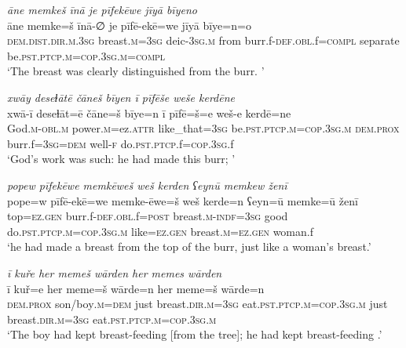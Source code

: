 \ea \label{ZQ.41}
\textit{āne memkeš īnā je pīfekēwe jīyā bīyeno} \\ 
\gll āne memke=š īnā-∅ je pīfē-ekē=we jīyā bīye=n=o \\ 
 \textsc{dem.dist}\textsc{.dir}\textsc{.m}\textsc{.3sg} breast\textsc{.m}\textsc{=3sg} deic\textsc{-3sg}\textsc{.m} from burr.f\textsc{-def}\textsc{.obl}.f\textsc{=compl} separate be\textsc{.pst}\textsc{.ptcp}\textsc{.m}\textsc{=cop}\textsc{.3sg}\textsc{.m}\textsc{=compl} \\ 
\glt `The breast was clearly distinguished from the burr. '
\z 
 
\ea \label{ZQ.42}
\textit{xwāy deseɫātē čāneš bīyen ī pīfēše weše kerdēne} \\ 
\gll xwā-ī deseɫāt=ē čāne=š bīye=n ī pīfē=š=e weš-e kerdē=ne \\ 
 God\textsc{.m}\textsc{-obl}\textsc{.m} power\textsc{.m}=ez.\textsc{attr} like\_that\textsc{=3sg} be\textsc{.pst}\textsc{.ptcp}\textsc{.m}\textsc{=cop}\textsc{.3sg}\textsc{.m} \textsc{dem.prox} burr.f\textsc{=3sg}\textsc{=dem} well\textsc{-f} do\textsc{.pst}\textsc{.ptcp}.f\textsc{=cop}\textsc{.3sg}.f \\ 
\glt `God’s work was such: he had made this burr; '
\z 
 
\ea \label{ZQ.43}
\textit{popew pīfekēwe memkēweš weš kerden ʕeynū memkew ženī} \\ 
\gll pope=w pīfē-ekē=we memke-ēwe=š weš kerde=n ʕeyn=ū memke=ū ženī \\ 
 top\textsc{=ez.gen} burr.f\textsc{-def}\textsc{.obl}.f\textsc{=\textsc{post}} breast\textsc{.m}\textsc{-indf}\textsc{=3sg} good do\textsc{.pst}\textsc{.ptcp}\textsc{.m}\textsc{=cop}\textsc{.3sg}\textsc{.m} like\textsc{=ez.gen} breast\textsc{.m}\textsc{=ez.gen} woman.f \\ 
\glt `he had made a breast from the top of the burr, just like a woman’s breast.'
\z 
 
\ea \label{ZQ.44}
\textit{ī kuře her memeš wārden her memes wārden} \\ 
\gll ī kuř=e her meme=š wārde=n her meme=š wārde=n \\ 
 \textsc{dem.prox} son/boy\textsc{.m}\textsc{=dem} just breast\textsc{.dir}\textsc{.m}\textsc{=3sg} eat\textsc{.pst}\textsc{.ptcp}\textsc{.m}\textsc{=cop}\textsc{.3sg}\textsc{.m} just breast\textsc{.dir}\textsc{.m}\textsc{=3sg} eat\textsc{.pst}\textsc{.ptcp}\textsc{.m}\textsc{=cop}\textsc{.3sg}\textsc{.m} \\ 
\glt `The boy had kept breast-feeding [from the tree]; he had kept breast-feeding .'
\z 
 
